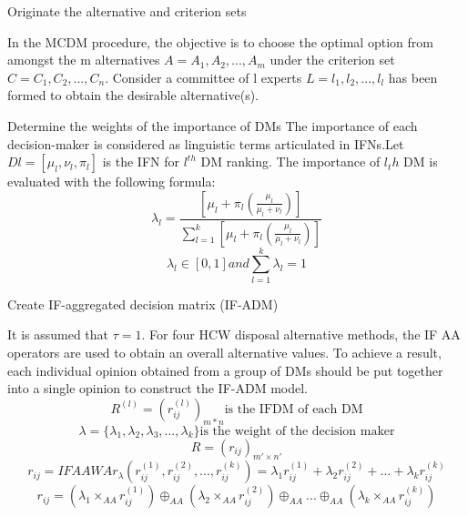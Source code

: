 \begin{flushleft}
\begin{steps}
\item  Originate the alternative and criterion sets

In the MCDM procedure, the objective is to choose the optimal
option from amongst the m alternatives $A={A_1,A_2,...,A_m}$ under
the criterion set $C={C_1,C_2,...,C_n}$. Consider a committee of l experts
 $L={l_1,l_2,...,l_l}$ has been formed to obtain the desirable
alternative(s).
\item Determine the weights of the importance of DMs
The importance of each decision-maker is considered as linguistic terms articulated in IFNs.Let $Dl=[\mu_l,\nu_l, \pi_l]$ is the IFN for $l^{th}$ DM ranking. The importance of $l_th$ DM is evaluated with the following formula:
\begin{equation}
    \lambda_l=\frac{[\mu_l+\pi_l(\frac{\mu_l}{\mu_l +\nu_l})]}{\sum_{l=1}^{k} [\mu_l+\pi_l(\frac{\mu_l}{\mu_l +\nu_l})]}
\end{equation}
\begin{equation*}
    \lambda_l \in [0,1] 
    and
 \sum_{l=1}^{k} \lambda_l =1
\end{equation*}
\item Create IF-aggregated decision matrix (IF-ADM)

It is assumed that $\tau =1$. For four HCW disposal
alternative methods, the IF AA operators are used to
obtain an overall alternative values. To achieve a result, each individual opinion
obtained from a group of DMs should be put together into a
single opinion to construct the IF-ADM model.
\begin{equation*}
    R^{(l)}=(r_{ij}^{(l)})_{m*n} \text{is the IFDM of each DM}
\end{equation*}
\begin{equation*}
    \lambda=\{\lambda_1,\lambda_2,\lambda_3,...,\lambda_k\} \text{is the weight of the decision maker}
\end{equation*}
\begin{equation*}
    R=(r_{ij})_{m'\times n'} 
\end{equation*}
\begin{equation*}
    r_{ij}=IFAAWA r_\lambda (r_{ij}^{(1)},r_{ij}^{(2)},...,r_{ij}^{(k)})=\lambda_1 r_{ij}^{(1)}+\lambda_2 r_{ij}^{(2)}+...+\lambda_k r_{ij}^{(k)}
\end{equation*}
\begin{equation}
    r_{ij}= (\lambda_1 \times_{AA} r_{ij}^{(1)}) \oplus_{AA} (\lambda_2 \times_{AA} r_{ij}^{(2)}) \oplus_{AA} ... \oplus_{AA} (\lambda_k \times_{AA} r_{ij}^{(k)})
\end{equation}






\end{steps}
\end{flushleft}
